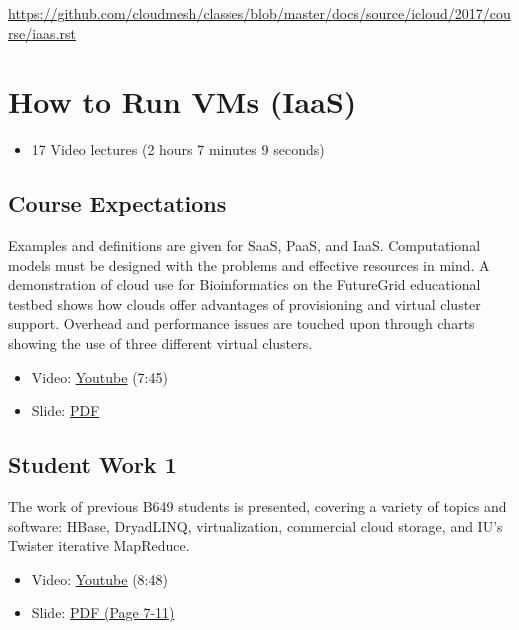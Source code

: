 \begin{fileremark}\url{https://github.com/cloudmesh/classes/blob/master/docs/source/icloud/2017/course/iaas.rst}\end{fileremark}
\section{How to Run VMs (IaaS)}\label{how-to-run-vms-iaas}

\begin{itemize}
\tightlist
\item
  17 Video lectures (2 hours 7 minutes 9 seconds)
\end{itemize}

\subsection{Course Expectations}\label{course-expectations}

Examples and definitions are given for SaaS, PaaS, and IaaS.
Computational models must be designed with the problems and effective
resources in mind. A demonstration of cloud use for Bioinformatics on
the FutureGrid educational testbed shows how clouds offer advantages of
provisioning and virtual cluster support. Overhead and performance
issues are touched upon through charts showing the use of three
different virtual clusters.

\begin{itemize}
\tightlist
\item
  Video: \href{https://www.youtube.com/watch?v=j3sUW376pw8}{Youtube}
  (7:45)
\end{itemize}

\begin{itemize}
\tightlist
\item
  Slide:
  \href{https://drive.google.com/open?id=0B88HKpainTSfQU1uQmxZWHdWQ1k}{PDF}
\end{itemize}

\subsection{Student Work 1}\label{student-work-1}

The work of previous B649 students is presented, covering a variety of
topics and software: HBase, DryadLINQ, virtualization, commercial cloud
storage, and IU's Twister iterative MapReduce.

\begin{itemize}
\tightlist
\item
  Video: \href{https://www.youtube.com/watch?v=DYG6_bUGsqY}{Youtube}
  (8:48)
\item
  Slide:
  \href{https://drive.google.com/open?id=0B88HKpainTSfQU1uQmxZWHdWQ1k}{PDF
  (Page 7-11)}
\end{itemize}

